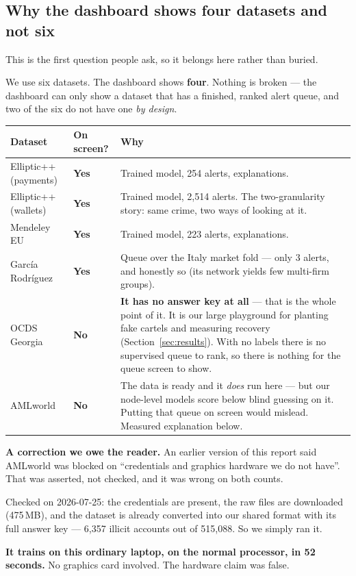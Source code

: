 \documentclass[11pt,a4paper]{article}
\begin{document}
\subsection{Why the dashboard shows four datasets and not six}

This is the first question people ask, so it belongs here rather than buried.

We use six datasets. The dashboard shows \textbf{four}. Nothing is broken --- the
dashboard can only show a dataset that has a finished, ranked alert queue, and
two of the six do not have one \emph{by design}.

\begin{longtable}{@{}p{3.4cm}p{2.4cm}p{9.3cm}@{}}
\toprule
\textbf{Dataset} & \textbf{On screen?} & \textbf{Why} \\
\midrule
\endhead
Elliptic++ (payments) & \textbf{Yes} & Trained model, 254 alerts, explanations. \\
Elliptic++ (wallets) & \textbf{Yes} & Trained model, 2{,}514 alerts. The
two-granularity story: same crime, two ways of looking at it. \\
Mendeley EU & \textbf{Yes} & Trained model, 223 alerts, explanations. \\
García Rodríguez & \textbf{Yes} & Queue over the Italy market fold --- only 3
alerts, and honestly so (its network yields few multi-firm groups). \\
\addlinespace
OCDS Georgia & \textbf{No} & \textbf{It has no answer key at all} --- that is the
whole point of it. It is our large playground for planting fake cartels and
measuring recovery (Section~\ref{sec:results}). With no labels there is no
supervised queue to rank, so there is nothing for the queue screen to show. \\
AMLworld & \textbf{No} & The data is ready and it \emph{does} run here --- but
our node-level models score below blind guessing on it. Putting that queue on
screen would mislead. Measured explanation below. \\
\bottomrule
\end{longtable}

\begin{warnbox}
\textbf{A correction we owe the reader.} An earlier version of this report said
AMLworld was blocked on ``credentials and graphics hardware we do not have''.
That was asserted, not checked, and it was wrong on both counts.

Checked on 2026-07-25: the credentials are present, the raw files are
downloaded (475\,MB), and the dataset is already converted into our shared
format with its full answer key --- 6{,}357 illicit accounts out of 515{,}088.
So we simply ran it.

\textbf{It trains on this ordinary laptop, on the normal processor, in 52
seconds.} No graphics card involved. The hardware claim was false.
\end{warnbox}
\end{document}
